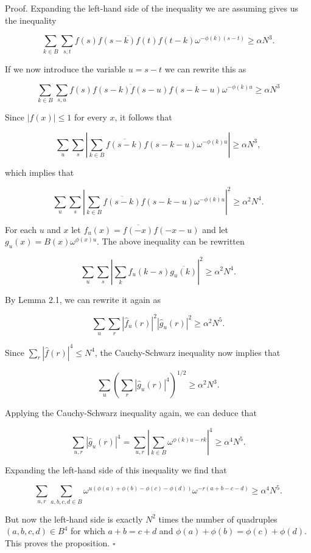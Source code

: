 \documentclass[10pt]{article}
\begin{document}
Proof. Expanding the left-hand side of the inequality we are assuming gives us the inequality

$$
\sum_{k \in B} \sum_{s, t} f(s) \overline{f(s-k) f(t)} f(t-k) \omega^{-\phi(k)(s-t)} \geqslant \alpha N^{3} .
$$

If we now introduce the variable $u=s-t$ we can rewrite this as

$$
\sum_{k \in B} \sum_{s, u} f(s) \overline{f(s-k) f(s-u)} f(s-k-u) \omega^{-\phi(k) u} \geqslant \alpha N^{3}
$$

Since $|f(x)| \leqslant 1$ for every $x$, it follows that

$$
\sum_{u} \sum_{s}\left|\sum_{k \in B} \overline{f(s-k)} f(s-k-u) \omega^{-\phi(k) u}\right| \geqslant \alpha N^{3},
$$

which implies that

$$
\sum_{u} \sum_{s}\left|\sum_{k \in B} \overline{f(s-k)} f(s-k-u) \omega^{-\phi(k) u}\right|^{2} \geqslant \alpha^{2} N^{4} .
$$

For each $u$ and $x$ let $f_{u}(x)=\overline{f(-x)} f(-x-u)$ and let $g_{u}(x)=B(x) \omega^{\phi(x) u}$. The above inequality can be rewritten

$$
\sum_{u} \sum_{s}\left|\sum_{k} f_{u}(k-s) \overline{g_{u}(k)}\right|^{2} \geqslant \alpha^{2} N^{4} .
$$

By Lemma 2.1, we can rewrite it again as

$$
\sum_{u} \sum_{r}\left|\hat{f}_{u}(r)\right|^{2}\left|\hat{g}_{u}(r)\right|^{2} \geqslant \alpha^{2} N^{5} .
$$

Since $\sum_{r}|\hat{f}(r)|^{4} \leqslant N^{4}$, the Cauchy-Schwarz inequality now implies that

$$
\sum_{u}\left(\sum_{r}\left|\hat{g}_{u}(r)\right|^{4}\right)^{1 / 2} \geqslant \alpha^{2} N^{3} .
$$

Applying the Cauchy-Schwarz inequality again, we can deduce that

$$
\sum_{u, r}\left|\hat{g}_{u}(r)\right|^{4}=\sum_{u, r}\left|\sum_{k \in B} \omega^{\phi(k) u-r k}\right|^{4} \geqslant \alpha^{4} N^{5} .
$$

Expanding the left-hand side of this inequality we find that

$$
\sum_{u, r} \sum_{a, b, c, d \in B} \omega^{u(\phi(a)+\phi(b)-\phi(c)-\phi(d))} \omega^{-r(a+b-c-d)} \geqslant \alpha^{4} N^{5} .
$$

But now the left-hand side is exactly $N^{2}$ times the number of quadruples $(a, b, c, d) \in B^{4}$ for which $a+b=c+d$ and $\phi(a)+\phi(b)=\phi(c)+\phi(d)$. This proves the proposition. \(\square\)
\end{document}
